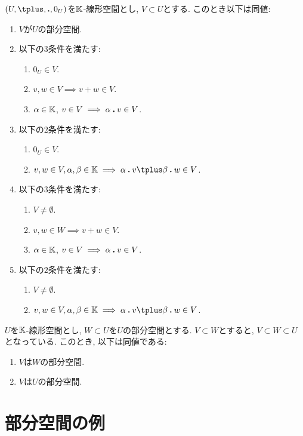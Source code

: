 \begin{lemma}
  $(U,\plus ,\act,0_U)$を$\mathbb{K}$-線形空間とし, $V\subset U$とする.
  このとき以下は同値:
  \begin{enumerate}
  \item $V$が$U$の部分空間.
  \item 以下の$3$条件を満たす:
    \begin{enumerate}
  \item $0_U\in V$.
  \item $v,w\in V \implies v\plus w\in V$.
  \item $\alpha\in\mathbb{K}$, $v\in V \implies \alpha\mathbin{\boldsymbol{.}} v\in V$.
    \end{enumerate}
  \item 以下の$2$条件を満たす:
    \begin{enumerate}
  \item $0_U\in V$.
  \item $v,w\in V, \alpha,\beta\in\KK \implies \alpha\act v\plus \beta\act w\in V$.
    \end{enumerate}
  \item 以下の$3$条件を満たす:
    \begin{enumerate}
  \item $V\neq \emptyset$.
  \item $v,w\in W \implies v\plus w\in V$.
  \item $\alpha\in\mathbb{K}$, $v\in V \implies \alpha\mathbin{\boldsymbol{.}} v\in V$.
    \end{enumerate}
  \item 以下の$2$条件を満たす:
    \begin{enumerate}
  \item $V\neq \emptyset$.
  \item $v,w\in V, \alpha,\beta\in\KK \implies \alpha\act v\plus \beta\act w\in V$.
    \end{enumerate}
  \end{enumerate}
\end{lemma}

\begin{remark}
$U$を$\mathbb{K}$-線形空間とし,
$W\subset U$を$U$の部分空間とする.
$V\subset W$とすると,
$V\subset W\subset U$となっている.
このとき, 以下は同値である:
\begin{enumerate}
\item $V$は$W$の部分空間.
\item $V$は$U$の部分空間.
\end{enumerate}
\end{remark}
\section{部分空間の例}
